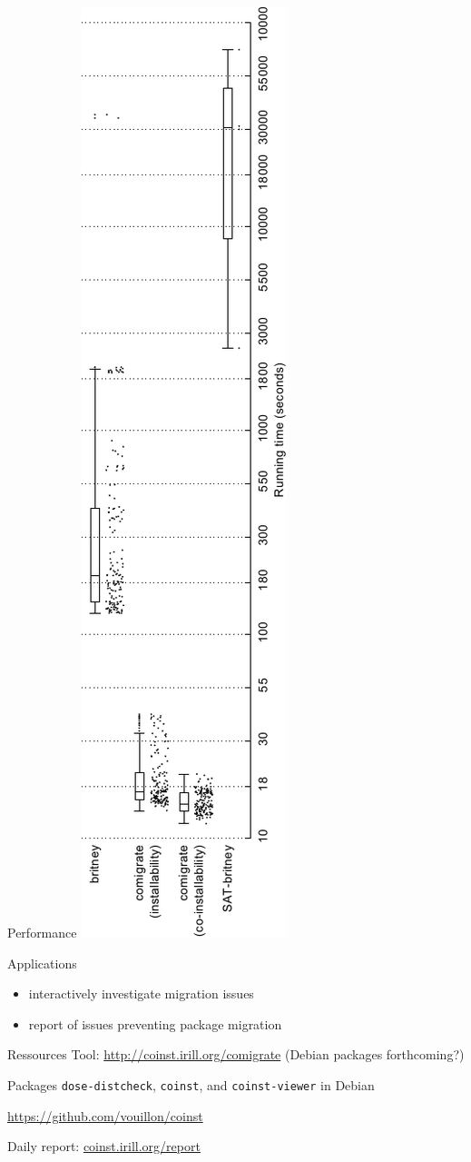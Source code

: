 \documentclass[xcolor={dvipsnames}]{beamer}
\begin{document}
\begin{frame}{Performance}
\includegraphics[height=\linewidth,angle=-90]{figures/performance.pdf}
\end{frame}

\begin{frame}{Applications}
\begin{itemize}
\item interactively investigate migration issues
\item report of issues preventing package migration
\end{itemize}
\end{frame}

\begin{frame}{Ressources}
Tool: \url{http://coinst.irill.org/comigrate}
(Debian packages forthcoming?)

Packages \texttt{dose-distcheck}, \texttt{coinst}, and
\texttt{coinst-viewer} in Debian

\url{https://github.com/vouillon/coinst}

Daily report:
\url{coinst.irill.org/report}
\end{frame}
\end{document}
